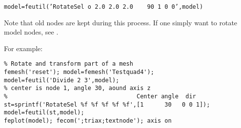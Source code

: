 {\tt model=feutil('RotateSel o 2.0 2.0 2.0 \ \ \  90  1 0 0',model)}

Note that old nodes are kept during this process. If one simply want to rotate model nodes, see . 

For example:

\begin{verbatim}
% Rotate and transform part of a mesh
femesh('reset'); model=femesh('Testquad4'); 
model=feutil('Divide 2 3',model); 
% center is node 1, angle 30, aound axis z
%                                     Center angle  dir
st=sprintf('RotateSel %f %f %f %f %f',[1      30   0 0 1]);
model=feutil(st,model);  
feplot(model); fecom(';triax;textnode'); axis on
\end{verbatim}%












